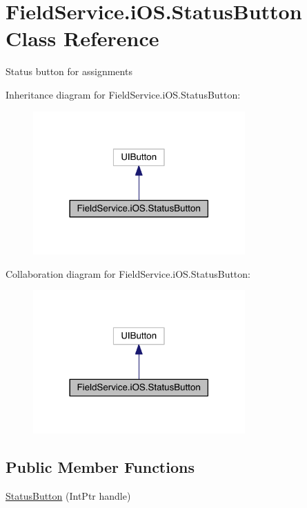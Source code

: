 \hypertarget{class_field_service_1_1i_o_s_1_1_status_button}{\section{Field\+Service.\+i\+O\+S.\+Status\+Button Class Reference}
\label{class_field_service_1_1i_o_s_1_1_status_button}
}


Status button for assignments  




Inheritance diagram for Field\+Service.\+i\+O\+S.\+Status\+Button\+:
\nopagebreak
\begin{figure}[H]
\begin{center}
\leavevmode
\includegraphics[width=230pt]{class_field_service_1_1i_o_s_1_1_status_button__inherit__graph}
\end{center}
\end{figure}


Collaboration diagram for Field\+Service.\+i\+O\+S.\+Status\+Button\+:
\nopagebreak
\begin{figure}[H]
\begin{center}
\leavevmode
\includegraphics[width=230pt]{class_field_service_1_1i_o_s_1_1_status_button__coll__graph}
\end{center}
\end{figure}
\subsection*{Public Member Functions}
\begin{DoxyCompactItemize}
\item 
\hyperlink{class_field_service_1_1i_o_s_1_1_status_button_adc8d5e9efd7b081f9a53ba1d1651ff8b}{Status\+Button} (Int\+Ptr handle)
\end{DoxyCompactItemize}
